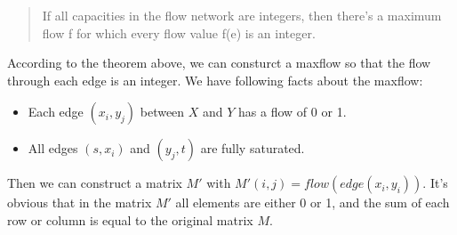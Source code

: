 \begin{quote}
If all capacities in the flow network are integers, then there's a maximum flow f for which every flow value f(e) is an integer.
\end{quote}

According to the theorem above, we can consturct a maxflow so that the flow through each edge is an integer. We have following facts about the maxflow:

\begin{itemize}
  \item{Each edge $(x_i, y_j)$ between $X$ and $Y$} has a flow of 0 or 1.
  \item{All edges $(s, x_i)$ and $(y_j, t)$ are fully saturated}.
\end{itemize}

Then we can construct a matrix $M'$ with $M'(i, j) = flow(edge(x_i, y_i))$. It's obvious that in the matrix $M'$ all elements are either 0 or 1, and the sum of each row or column is equal to the original matrix $M$.
